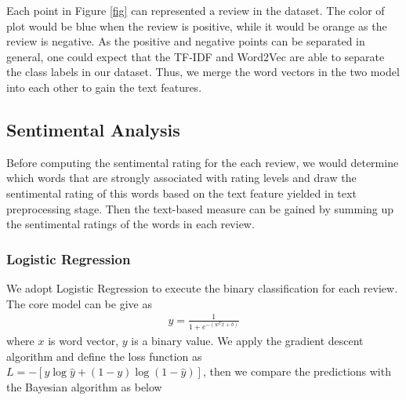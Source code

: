 \documentclass[12pt]{article}%
\begin{document}
Each point in Figure \ref{fig} can represented a review in the dataset. The color of plot would be blue when the review is positive, while it would be orange as the review is negative. As the positive and negative points can be separated in general, one could expect that the TF-IDF and Word2Vec are able to separate the class labels in our dataset. Thus, we merge the word vectors in the two model into each other to gain the text features.
 

\subsection{Sentimental Analysis}
Before computing the sentimental rating for the each review, we would determine which words that are strongly associated with rating levels and draw the sentimental rating of this words based on the text feature yielded in text preprocessing stage. Then the text-based measure can be gained by summing up the sentimental ratings of the words in each review. 

\subsubsection{Logistic Regression}
We adopt Logistic Regression to execute the binary classification for each review. The core model can be give as
\begin{gather}
y=\frac{1}{1+e^{-\left(w^{T} x+b\right)}}
\end{gather}
where $x$ is word vector, $y$ is a binary value. We apply the gradient descent algorithm and define the loss function as $L=-[y \log \hat{y}+(1-y) \log (1-\hat{y})]$, then we compare the predictions with the Bayesian algorithm \cite{bbb} as below
\end{document}

